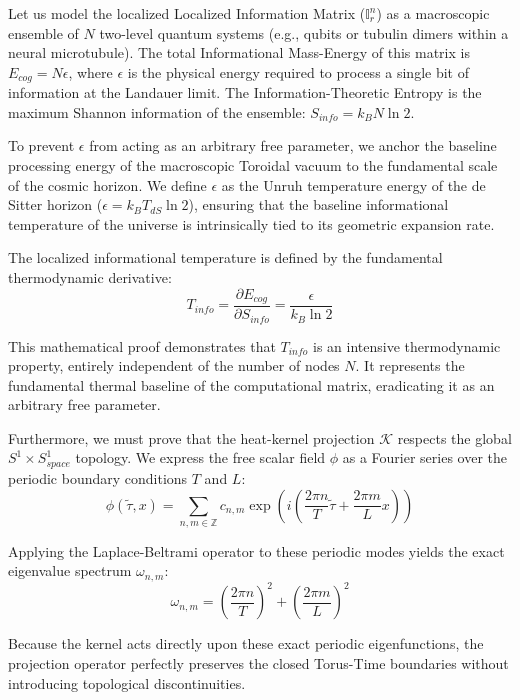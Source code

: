 \documentclass[12pt,openany]{book}
\theoremstyle{plain}
\theoremstyle{definition}
\theoremstyle{remark}
\begin{document}
Let us model the localized Localized Information Matrix ($\mathbb{I}_r^n$) as a macroscopic ensemble of $N$ two-level quantum systems (e.g., qubits or tubulin dimers within a neural microtubule). The total Informational Mass-Energy of this matrix is $E_{cog} = N\epsilon$, where $\epsilon$ is the physical energy required to process a single bit of information at the Landauer limit. The Information-Theoretic Entropy is the maximum Shannon information of the ensemble: $S_{info} = k_B N \ln 2$. 

To prevent $\epsilon$ from acting as an arbitrary free parameter, we anchor the baseline processing energy of the macroscopic Toroidal vacuum to the fundamental scale of the cosmic horizon. We define $\epsilon$ as the Unruh temperature energy of the de Sitter horizon ($\epsilon = k_B T_{dS} \ln 2$), ensuring that the baseline informational temperature of the universe is intrinsically tied to its geometric expansion rate.

The localized informational temperature is defined by the fundamental thermodynamic derivative:
\begin{equation}
T_{info} = \frac{\partial E_{cog}}{\partial S_{info}} = \frac{\epsilon}{k_B \ln 2}
\end{equation}

This mathematical proof demonstrates that $T_{info}$ is an intensive thermodynamic property, entirely independent of the number of nodes $N$. It represents the fundamental thermal baseline of the computational matrix, eradicating it as an arbitrary free parameter.

Furthermore, we must prove that the heat-kernel projection $\mathcal{K}$ respects the global $S^1 \times S^1_{space}$ topology. We express the free scalar field $\phi$ as a Fourier series over the periodic boundary conditions $T$ and $L$:
\begin{equation}
\phi(\tilde{\tau}, x) = \sum_{n,m \in \mathbb{Z}} c_{n,m} \exp\left( i\left( \frac{2\pi n}{T}\tilde{\tau} + \frac{2\pi m}{L}x \right) \right)
\end{equation}

Applying the Laplace-Beltrami operator to these periodic modes yields the exact eigenvalue spectrum $\omega_{n,m}$:
\begin{equation}
\omega_{n,m} = \left( \frac{2\pi n}{T} \right)^2 + \left( \frac{2\pi m}{L} \right)^2
\end{equation}

Because the kernel acts directly upon these exact periodic eigenfunctions, the projection operator perfectly preserves the closed Torus-Time boundaries without introducing topological discontinuities.
\end{document}
